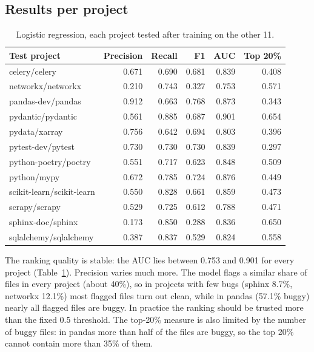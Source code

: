 \documentclass[11pt,a4paper]{article}
\begin{document}
\subsection{Results per project}

\begin{table}[h]
\centering
\begin{tabular}{lrrrrr}
\toprule
Test project & Precision & Recall & F1 & AUC & Top 20\% \\
\midrule
celery/celery & 0.671 & 0.690 & 0.681 & 0.839 & 0.408 \\
networkx/networkx & 0.210 & 0.743 & 0.327 & 0.753 & 0.571 \\
pandas-dev/pandas & 0.912 & 0.663 & 0.768 & 0.873 & 0.343 \\
pydantic/pydantic & 0.561 & 0.885 & 0.687 & 0.901 & 0.654 \\
pydata/xarray & 0.756 & 0.642 & 0.694 & 0.803 & 0.396 \\
pytest-dev/pytest & 0.730 & 0.730 & 0.730 & 0.839 & 0.297 \\
python-poetry/poetry & 0.551 & 0.717 & 0.623 & 0.848 & 0.509 \\
python/mypy & 0.672 & 0.785 & 0.724 & 0.876 & 0.449 \\
scikit-learn/scikit-learn & 0.550 & 0.828 & 0.661 & 0.859 & 0.473 \\
scrapy/scrapy & 0.529 & 0.725 & 0.612 & 0.788 & 0.471 \\
sphinx-doc/sphinx & 0.173 & 0.850 & 0.288 & 0.836 & 0.650 \\
sqlalchemy/sqlalchemy & 0.387 & 0.837 & 0.529 & 0.824 & 0.558 \\
\bottomrule
\end{tabular}
\caption{Logistic regression, each project tested after training on the other 11.}
\label{tab:projects}
\end{table}

The ranking quality is stable: the AUC lies between 0.753 and 0.901 for every
project (Table~\ref{tab:projects}). Precision varies much more. The model
flags a similar share of files in every project (about 40\%), so in projects with few bugs
(sphinx 8.7\%, networkx 12.1\%) most flagged files turn out clean, while in
pandas (57.1\% buggy) nearly all flagged files are buggy. In practice the
ranking should be trusted more than the fixed 0.5 threshold. The top-20\%
measure is also limited by the number of buggy files: in pandas more than
half of the files are buggy, so the top 20\% cannot contain more than 35\% of
them.
\end{document}
